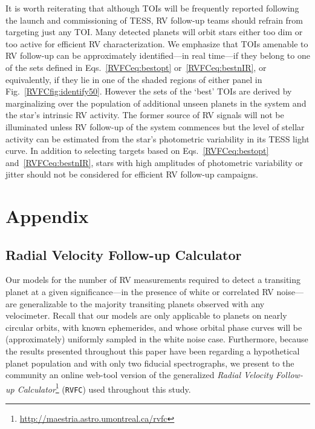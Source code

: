 It is worth reiterating that although TOIs will be frequently reported following the launch and
commissioning of TESS, RV follow-up teams should refrain from targeting just any TOI. Many detected
planets will orbit stars either too dim or too active for efficient RV characterization. We emphasize
that TOIs amenable to RV follow-up can be approximately identified---in real time---if they belong
to one of the sets defined in Eqs.~\ref{RVFCeq:bestopt} or~\ref{RVFCeq:bestnIR}, or equivalently, if they lie
in one of the shaded regions of either panel in Fig.~\ref{RVFCfig:identify50}. However the sets of the
`best' TOIs are derived by marginalizing over the population of additional unseen planets in the
system and the star's intrinsic RV activity. The former source of RV signals will not be illuminated
unless RV follow-up of the system commences but the level of stellar activity can be estimated
from the star's photometric variability in its TESS light curve. In addition to selecting targets
based on Eqs.~\ref{RVFCeq:bestopt} and~\ref{RVFCeq:bestnIR}, stars with high amplitudes of photometric
variability or jitter should not be considered for efficient RV follow-up campaigns.



\section{Appendix}
\subsection{Radial Velocity Follow-up Calculator} \label{RVFCapp:rvfc}
Our models for the number of RV measurements \nrv{} required to detect a transiting planet
at a given
significance---in the presence of white or correlated RV noise---are generalizable to the majority
transiting planets observed with any velocimeter. Recall that our models are only applicable to
planets on nearly circular orbits, with known ephemerides, and 
whose orbital phase curves will be (approximately) uniformly sampled in the white noise case.
Furthermore, because the results presented throughout this paper
have been regarding a hypothetical planet population and with only two fiducial spectrographs,
we present to the community an online web-tool version of the generalized
\emph{Radial Velocity Follow-up Calculator}\footnote{\url{http://maestria.astro.umontreal.ca/rvfc}}
(\texttt{RVFC}) used throughout this study. \\


